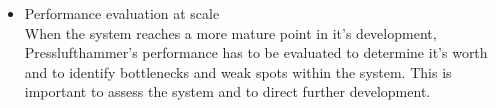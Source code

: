 \begin{itemize}
    \item Performance evaluation at scale\\
      When the system reaches a more mature point in it's development,
      Presslufthammer's performance has to be evaluated to determine it's worth
      and to identify bottlenecks and weak spots within the system. This is
      important to assess the system and to direct further development.
    
  \end{itemize}


